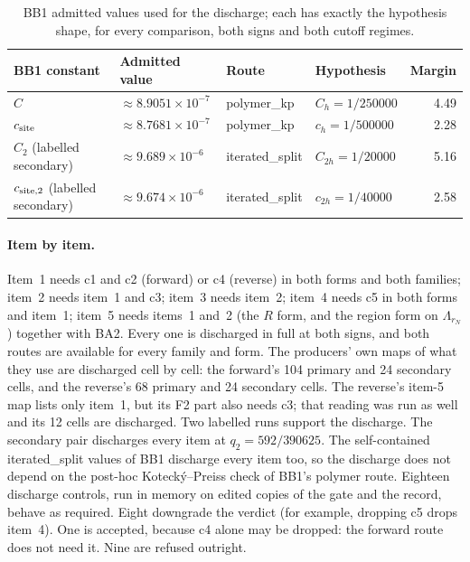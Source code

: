 \begin{table}[htbp]
\centering\small
\caption{BB1 admitted values used for the discharge; each has exactly the
hypothesis shape, for every comparison, both signs and both cutoff regimes.}
\label{tab:bb2-admitted}
\begin{tabular}{llllr}
\toprule
BB1 constant & Admitted value & Route & Hypothesis & Margin\\
\midrule
$C$ & $\approx8.9051\times10^{-7}$ & polymer\_kp & $C_h=1/250000$ & 4.49\\
$c_{\rm site}$ & $\approx8.7681\times10^{-7}$ & polymer\_kp & $c_h=1/500000$ & 2.28\\
$C_2$ (labelled secondary) & $\approx9.689\times10^{-6}$ & iterated\_split & $C_{2h}=1/20000$ & 5.16\\
$c_{{\rm site},2}$ (labelled secondary) & $\approx9.674\times10^{-6}$ & iterated\_split & $c_{2h}=1/40000$ & 2.58\\
\bottomrule
\end{tabular}
\end{table}

\paragraph{Item by item.} Item~1 needs c1 and c2 (forward) or c4 (reverse) in
both forms and both families; item~2 needs item~1 and c3; item~3 needs item~2;
item~4 needs c5 in both forms and item~1; item~5 needs items~1 and~2 (the $R$
form, and the region form on $\Lambda_{r_N}$) together with BA2. Every one is
discharged in full at both signs, and both routes are available for every
family and form. The producers' own maps of what they use are discharged
cell by cell: the forward's 104 primary and 24 secondary cells, and the
reverse's 68 primary and 24 secondary cells. The reverse's item-5 map lists
only item~1, but its F2 part also needs c3; that reading was run as well and
its 12 cells are discharged. Two labelled runs support the discharge. The
secondary pair discharges every item at $q_2=592/390625$. The
self-contained iterated\_split values of BB1 discharge every item too, so the
discharge does not depend on the post-hoc Kotecký--Preiss check of BB1's
polymer route. Eighteen discharge controls, run in memory on edited copies
of the gate and the record, behave as required. Eight downgrade the
verdict (for example, dropping c5 drops item~4). One is accepted, because c4
alone may be dropped: the forward route does not need it. Nine are refused
outright.

